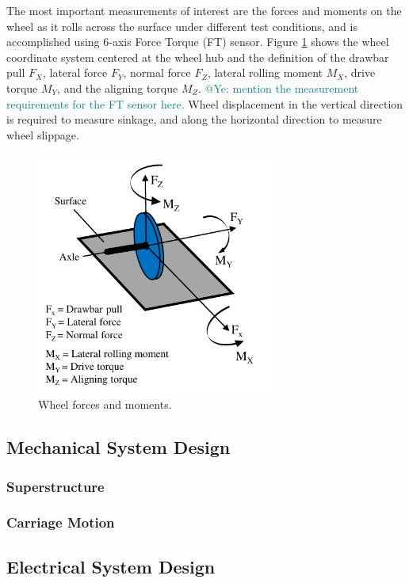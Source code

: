 \documentclass{article}
\begin{document}
The most important measurements of interest are the forces and moments on the wheel as it rolls across the surface under different test conditions, and is accomplished using 6-axis Force Torque (FT) sensor. Figure \ref{fig:wheel-forces-and-moments} shows the wheel coordinate system centered at the wheel hub and the definition of the drawbar pull $F_X$, lateral force $F_Y$, normal force $F_Z$, lateral rolling moment $M_X$, drive torque $M_Y$, and the aligning torque $M_Z$. \textcolor{teal}{@Ye: mention the measurement requirements for the FT sensor here.} Wheel displacement in the vertical direction is required to measure sinkage, and along the horizontal direction to measure wheel slippage. 

\begin{figure}[hbt!]
\centering
\includegraphics[width=3.15in]{general-images/wheel-forces-and-moments.pdf}
\caption{Wheel forces and moments.}
\label{fig:wheel-forces-and-moments}
\end{figure}


\subsection{Mechanical System Design}


\subsubsection{Superstructure}


\subsubsection{Carriage Motion}
\label{subsubsec:carriage-motion}

\subsection{Electrical System Design}
\end{document}
